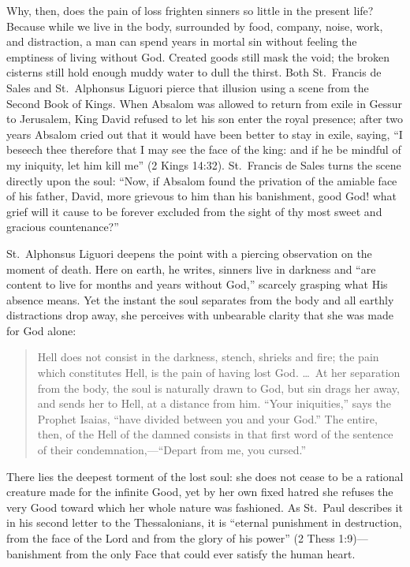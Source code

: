 Why, then, does the pain of loss frighten sinners so little in the present life? Because while we live in the body, surrounded by food, company, noise, work, and distraction, a man can spend years in mortal sin without feeling the emptiness of living without God. Created goods still mask the void; the broken cisterns still hold enough muddy water to dull the thirst. Both St.\ Francis de Sales and St.\ Alphonsus Liguori pierce that illusion using a scene from the Second Book of Kings. When Absalom was allowed to return from exile in Gessur to Jerusalem, King David refused to let his son enter the royal presence; after two years Absalom cried out that it would have been better to stay in exile, saying, ``I beseech thee therefore that I may see the face of the king: and if he be mindful of my iniquity, let him kill me'' (2 Kings 14:32). St.\ Francis de Sales turns the scene directly upon the soul: ``Now, if Absalom found the privation of the amiable face of his father, David, more grievous to him than his banishment, good God! what grief will it cause to be forever excluded from the sight of thy most sweet and gracious countenance?''

St.\ Alphonsus Liguori deepens the point with a piercing observation on the moment of death. Here on earth, he writes, sinners live in darkness and ``are content to live for months and years without God,'' scarcely grasping what His absence means. Yet the instant the soul separates from the body and all earthly distractions drop away, she perceives with unbearable clarity that she was made for God alone:

\begin{quote}
Hell does not consist in the darkness, stench, shrieks and fire; the pain which constitutes Hell, is the pain of having lost God. \dots\ At her separation from the body, the soul is naturally drawn to God, but sin drags her away, and sends her to Hell, at a distance from him. ``Your iniquities,'' says the Prophet Isaias, ``have divided between you and your God.'' The entire, then, of the Hell of the damned consists in that first word of the sentence of their condemnation,---``Depart from me, you cursed.''
\end{quote}

There lies the deepest torment of the lost soul: she does not cease to be a rational creature made for the infinite Good, yet by her own fixed hatred she refuses the very Good toward which her whole nature was fashioned. As St.\ Paul describes it in his second letter to the Thessalonians, it is ``eternal punishment in destruction, from the face of the Lord and from the glory of his power'' (2 Thess 1:9)---banishment from the only Face that could ever satisfy the human heart.
